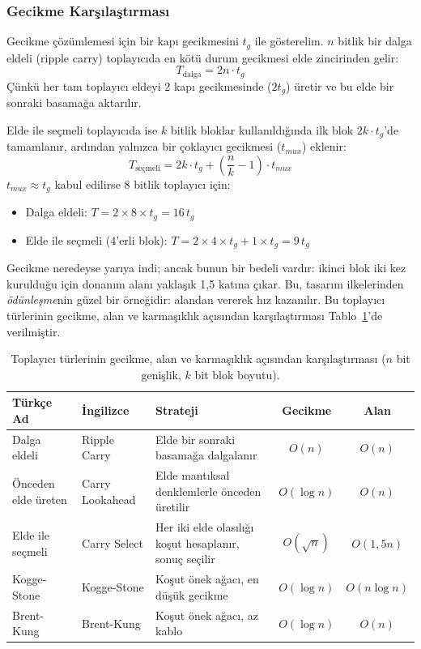 \subsubsection*{Gecikme Karşılaştırması}

Gecikme çözümlemesi için bir kapı gecikmesini $t_g$ ile gösterelim. $n$ bitlik bir dalga eldeli (ripple carry) toplayıcıda en kötü durum gecikmesi elde zincirinden gelir:
\[
T_{\text{dalga}} = 2n \cdot t_g
\]
Çünkü her tam toplayıcı eldeyi 2 kapı gecikmesinde ($2t_g$) üretir ve bu elde bir sonraki basamağa aktarılır.

Elde ile seçmeli toplayıcıda ise $k$ bitlik bloklar kullanıldığında ilk blok $2k \cdot t_g$'de tamamlanır, ardından yalnızca bir çoklayıcı gecikmesi ($t_{mux}$) eklenir:
\[
T_{\text{seçmeli}} = 2k \cdot t_g + \left(\frac{n}{k} - 1\right) \cdot t_{mux}
\]
$t_{mux} \approx t_g$ kabul edilirse 8 bitlik toplayıcı için:
\begin{itemize}
  \item Dalga eldeli: $T = 2 \times 8 \times t_g = 16\,t_g$
  \item Elde ile seçmeli (4'erli blok): $T = 2 \times 4 \times t_g + 1 \times t_g = 9\,t_g$
\end{itemize}
Gecikme neredeyse yarıya indi; ancak bunun bir bedeli vardır: ikinci blok iki kez kurulduğu için donanım alanı yaklaşık 1{,}5 katına çıkar. Bu, tasarım ilkelerinden \emph{ödünleşme}nin güzel bir örneğidir: alandan vererek hız kazanılır. Bu toplayıcı türlerinin gecikme, alan ve karmaşıklık açısından karşılaştırması Tablo~\ref{tab:toplayici-karsilastirma}'de verilmiştir.

\begin{table}[htbp]
\centering
\caption[Toplayıcı türlerinin karşılaştırması]{Toplayıcı türlerinin gecikme, alan ve karmaşıklık açısından karşılaştırması ($n$ bit genişlik, $k$ bit blok boyutu).}
\label{tab:toplayici-karsilastirma}
\small
\begin{tabularx}{\textwidth}{l l X c c}
\toprule
\textbf{Türkçe Ad} & \textbf{İngilizce} & \textbf{Strateji} & \textbf{Gecikme} & \textbf{Alan} \\
\midrule
Dalga eldeli & Ripple Carry & Elde bir sonraki basamağa dalgalanır & $O(n)$ & $O(n)$ \\
Önceden elde üreten & Carry Lookahead & Elde mantıksal denklemlerle önceden üretilir & $O(\log n)$ & $O(n)$ \\
Elde ile seçmeli & Carry Select & Her iki elde olasılığı koşut hesaplanır, sonuç seçilir & $O(\sqrt{n})$ & $O(1{,}5n)$ \\
Kogge-Stone & Kogge-Stone & Koşut önek ağacı, en düşük gecikme & $O(\log n)$ & $O(n \log n)$ \\
Brent-Kung & Brent-Kung & Koşut önek ağacı, az kablo & $O(\log n)$ & $O(n)$ \\
\bottomrule
\end{tabularx}
\end{table}

